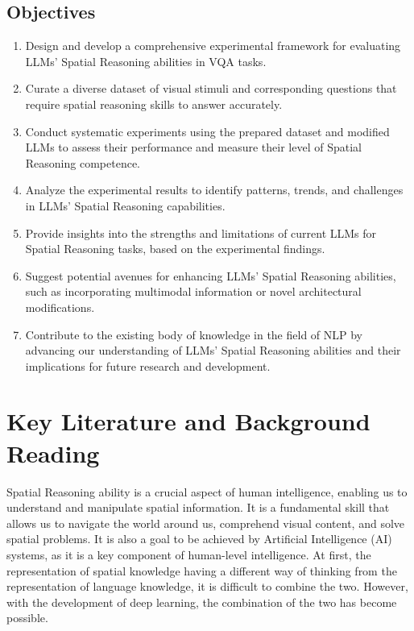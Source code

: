 \documentclass[journal,10pt]{IEEEtran}
\begin{document}
\subsection{Objectives}
\begin{enumerate}
    \item Design and develop a comprehensive experimental framework for evaluating LLMs' Spatial Reasoning abilities in VQA tasks.
    \item Curate a diverse dataset of visual stimuli and corresponding questions that require spatial reasoning skills to answer accurately.
    \item Conduct systematic experiments using the prepared dataset and modified LLMs to assess their performance and measure their level of Spatial Reasoning competence.
    \item Analyze the experimental results to identify patterns, trends, and challenges in LLMs' Spatial Reasoning capabilities.
    \item Provide insights into the strengths and limitations of current LLMs for Spatial Reasoning tasks, based on the experimental findings.
    \item Suggest potential avenues for enhancing LLMs' Spatial Reasoning abilities, such as incorporating multimodal information or novel architectural modifications.
    \item Contribute to the existing body of knowledge in the field of NLP by advancing our understanding of LLMs' Spatial Reasoning abilities and their implications for future research and development.
\end{enumerate}

\section{Key Literature and Background Reading}
Spatial Reasoning ability is a crucial aspect of human intelligence, enabling us to understand and manipulate spatial information. It is a fundamental skill that allows us to navigate the world around us, comprehend visual content, and solve spatial problems. It is also a goal to be achieved by Artificial Intelligence (AI) systems, as it is a key component of human-level intelligence. At first, the representation of spatial knowledge having a different way of thinking from the representation of language knowledge, it is difficult to combine the two. However, with the development of deep learning, the combination of the two has become possible.
\end{document}
